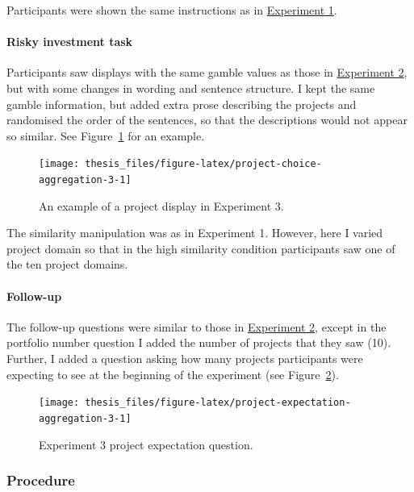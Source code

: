 \documentclass[a4paper, nobind, dvipsnames]{templates/ociamthesis}
\theoremstyle{definition}
\theoremstyle{definition}
\theoremstyle{definition}
\theoremstyle{definition}
\theoremstyle{remark}
\begin{document}
Participants were shown the same instructions as in
\protect\hyperlink{instructions-materials-aggregation-1}{Experiment 1}.

\hypertarget{task-aggregation-3}{%
\paragraph{Risky investment task}\label{task-aggregation-3}}

Participants saw displays with the same gamble values as those in
\protect\hyperlink{task-aggregation-2}{Experiment 2}, but with some changes in wording and
sentence structure. I kept the same gamble information, but added extra prose
describing the projects and randomised the order of the sentences, so that the
descriptions would not appear so similar. See
Figure~\ref{fig:project-choice-aggregation-3} for an example.



\begin{figure}
\texttt{[image: thesis\_files/figure-latex/project-choice-aggregation-3-1]} \caption{An example of a project display in Experiment 3.}\label{fig:project-choice-aggregation-3}
\end{figure}

The similarity manipulation was as in Experiment 1. However, here I varied
project domain so that in the high similarity condition participants saw one of
the ten project domains.

\hypertarget{follow-up-aggregation-3}{%
\paragraph{Follow-up}\label{follow-up-aggregation-3}}

The follow-up questions were similar to those in
\protect\hyperlink{follow-up-aggregation-2}{Experiment 2}, except in the portfolio number
question I added the number of projects that they saw (10). Further, I added a
question asking how many projects participants were expecting to see at the
beginning of the experiment (see
Figure~\ref{fig:project-expectation-aggregation-3}).



\begin{figure}
\texttt{[image: thesis\_files/figure-latex/project-expectation-aggregation-3-1]} \caption{Experiment 3 project expectation question.}\label{fig:project-expectation-aggregation-3}
\end{figure}

\subsubsection{Procedure}
\end{document}
